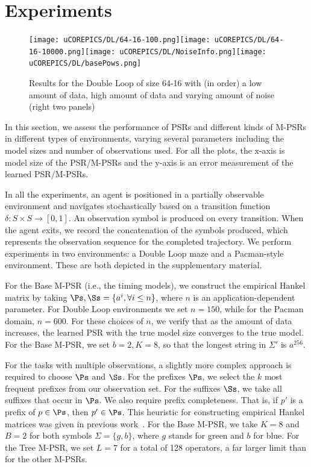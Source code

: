 \section{Experiments}\label{sec:exp}


\begin{figure}[ht!]
\centering
\texttt{[image: uCOREPICS/DL/64-16-100.png]}\texttt{[image: uCOREPICS/DL/64-16-10000.png]}\texttt{[image: uCOREPICS/DL/NoiseInfo.png]}\texttt{[image: uCOREPICS/DL/basePows.png]}

\caption{Results for the Double Loop of size 64-16 with (in order) a low amount of data, high amount of data and varying amount of noise (right two panels)\label{fig-double}}
\end{figure}


In this section, we assess the performance of PSRs and different kinds of M-PSRs in different types of environments, varying several parameters including the model sizes and number of observations used. For all the plots, the x-axis is model size of the PSR/M-PSRs and the y-axis is an error measurement of the learned PSR/M-PSRs.

In all the experiments, an agent is positioned in  a partially observable environment and  navigates  stochastically based on a transition function $\delta:S \times S\rightarrow[0,1]$. An observation symbol is produced on every transition. When the agent exits, we record the concatenation of the symbols produced, which represents the observation sequence for the completed trajectory.  We perform experiments in two environments: a Double Loop maze and a Pacman-style environment. These are both depicted in the supplementary material.


For the Base M-PSR (i.e., the timing models), we construct the empirical Hankel matrix by taking $\Ps, \Ss = \{a^i, \forall i \leq n\}$, where $n$ is an application-dependent parameter. For Double Loop environments we set $n = 150$, while for the Pacman domain, $n = 600$. For these choices of $n$, we verify that as the amount of data increases, the learned PSR with the true model size converges to the true model. For the Base M-PSR, we set $b=2, K=8$, so that the longest string in $\Sigma'$ is $a^{256}$.

For the tasks with multiple observations, a slightly more complex approach is required to choose $\Ps$ and $\Ss$. For the prefixes $\Ps$, we select the $k$ most frequent prefixes from our observation set. For the suffixes $\Ss$, we take all suffixes that occur in $\Ps$. We also require prefix completeness. That is, if $p'$ is a prefix of $p \in \Ps$, then $p' \in \Ps$. This heuristic for constructing empirical Hankel matrices was given in previous work~\cite{icml12}. For the Base M-PSR, we take $K=8$ and $B=2$ for both symbols $\Sigma=\{g,b\}$, where $g$ stands for green and $b$ for blue. For the Tree M-PSR, we set $L=7$ for a total of 128 operators, a far larger limit  than for the other M-PSRs. 

